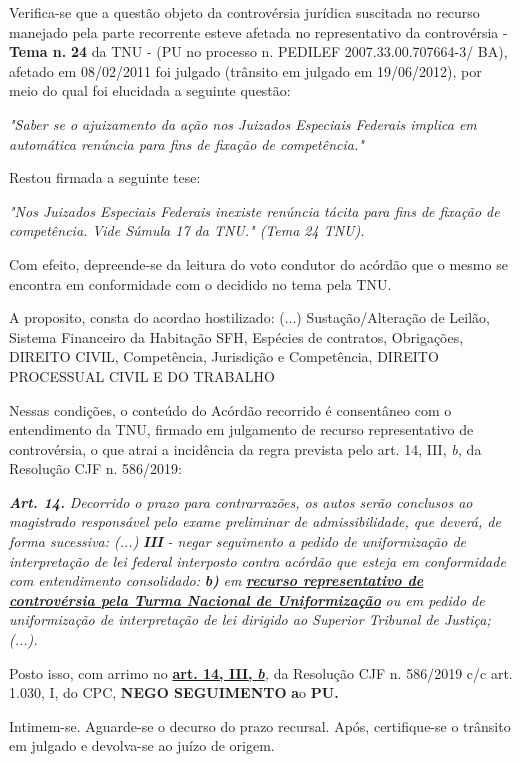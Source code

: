 \documentclass[12pt]{article}
\begin{document}
\justifying
\noindent Verifica-se que a questão objeto da controvérsia jurídica suscitada no recurso manejado pela parte recorrente esteve afetada no representativo da controvérsia - \textbf{Tema n. }\textbf{24} da TNU - (PU no processo n. PEDILEF 2007.33.00.707664-3/ BA),  afetado em 08/02/2011 foi julgado (trânsito em julgado em 19/06/2012), por meio do qual foi elucidada a seguinte questão:

\noindent \textit{"Saber se o ajuizamento da ação nos Juizados Especiais Federais implica em automática renúncia para fins de fixação de competência."}

\noindent Restou firmada a seguinte tese:

\noindent \textit{"Nos Juizados Especiais Federais inexiste renúncia tácita para fins de fixação de competência. Vide Súmula 17 da TNU." (Tema 24 TNU).}

\noindent Com efeito, depreende-se da leitura do voto condutor do acórdão que o mesmo se encontra em conformidade com o decidido no  tema pela TNU.

\noindent A proposito, consta do acordao hostilizado: (...) Sustação/Alteração de Leilão, Sistema Financeiro da Habitação SFH, Espécies de contratos, Obrigações, DIREITO CIVIL, Competência, Jurisdição e Competência, DIREITO PROCESSUAL CIVIL E DO TRABALHO

\noindent Nessas condições, o conteúdo do Acórdão recorrido é consentâneo com o entendimento da TNU, firmado em julgamento de recurso representativo de controvérsia, o que atrai a incidência da regra prevista pelo art. 14, III, \textit{b,} da Resolução CJF n. 586/2019:

\noindent \textit{\textbf{Art. 14.}}\textit{ Decorrido o prazo para contrarrazões, os autos serão conclusos ao magistrado responsável pelo exame preliminar de admissibilidade, que deverá, de forma sucessiva: (...) }\textit{\textbf{III }}\textit{- negar seguimento a pedido de uniformização de interpretação de lei federal interposto contra acórdão que esteja em conformidade com entendimento consolidado: }\textit{\textbf{b)}}\textit{ em }\uline{\textit{\textbf{recurso representativo de controvérsia pela Turma Nacional de Uniformização}}}\textit{ ou em pedido de uniformização de interpretação de lei dirigido ao Superior Tribunal de Justiça;(...).}

\noindent Posto isso, com arrimo no \uline{\textbf{art. 14, III, }}\uline{\textit{\textbf{b}}}\textit{,} da Resolução CJF n. 586/2019 c/c art. 1.030, I, do CPC, \textbf{NEGO SEGUIMENTO }\textbf{a}o\textbf{ PU}\textbf{.}

\noindent Intimem-se. Aguarde-se o decurso do prazo recursal. Após, certifique-se o trânsito em julgado e devolva-se ao juízo de origem.
\end{document}
